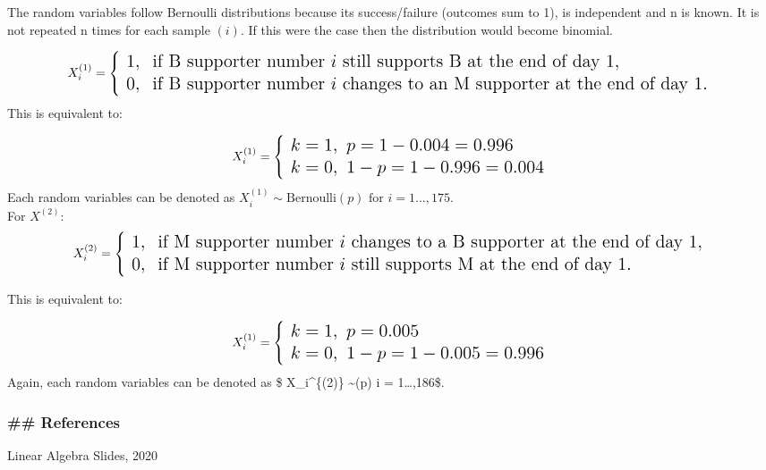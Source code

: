 \documentclass[
]{article}
\begin{document}
The random variables follow Bernoulli distributions because its
success/failure (outcomes sum to 1), is independent and n is known. It
is not repeated n times for each sample \((i)\). If this were the case
then the distribution would become binomial.

\[
\Large
X_i^{(1)} = \left\{
\begin{array}{ll}
1, & \text{if B supporter number } i \text{ still supports B at the end of day 1}, \\
0, & \text{if B supporter number } i \text{ changes to an M supporter at the end of day 1}.
\end{array}
\right.
\] This is equivalent to:

\[
\Large
X_i^{(1)} = \left\{
\begin{array}{ll}
k= 1, \text{ }p = 1- 0.004 = 0.996 \\
k= 0, \text{ }1-p = 1- 0.996 = 0.004
\end{array}
\right.
\] Each random variables can be denoted as
\(X_i^{(1)} \sim \text{Bernoulli}(p) \text{ for } i = 1...,175\).\\

For \(X^{(2)}\): \[
\Large
X_i^{(2)} = \left\{
\begin{array}{ll}
1, & \text{if M supporter number } i \text{ changes to a B supporter at the end of day 1}, \\
0, & \text{if M supporter number } i \text{ still supports M at the end of day 1}.
\end{array}
\right.
\]

This is equivalent to:

\[
\Large
X_i^{(1)} = \left\{
\begin{array}{ll}
k=1, \text{ }p = 0.005 \\
k=0, \text{ }1-p = 1- 0.005 = 0.996
\end{array}
\right.
\] Again, each random variables can be denoted as \$ X\_i\^{}\{(2)\}
\sim {}(p)  i = 1\ldots,186\$.\\

\subsubsection{\#\# References}\label{references}

Linear Algebra Slides, 2020
\end{document}
